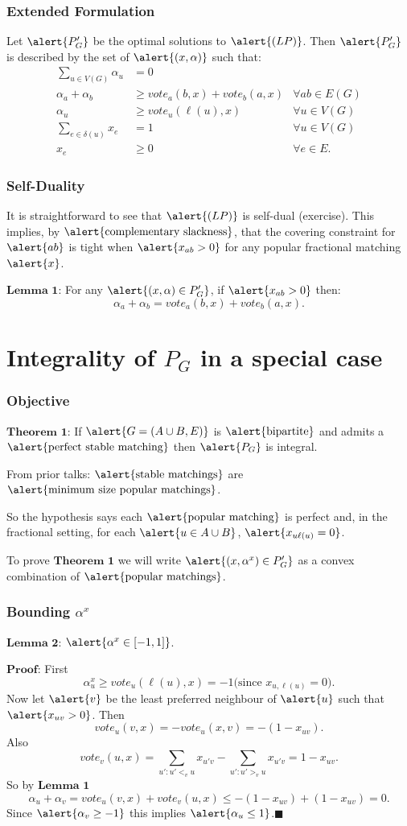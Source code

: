 \documentclass[10pt]{beamer}
\begin{document}
\begin{frame}
\frametitle{Extended Formulation}
Let $\alert{P'_G}$ be the optimal solutions to $\alert{(LP)}$. Then $\alert{P'_G}$ is described by the set of $\alert{(x,\alpha)}$ such that:
\begin{align*}
\sum_{u \in V(G)} \alpha_u &= 0 \\
 \alpha_a + \alpha_b &\geq vote_a(b,x) + vote_b(a,x) &\forall ab \in E(G) \\
\alpha_u &\geq vote_u(\ell(u),x) &\forall u \in V(G) \\
\sum_{e \in \delta(u)} x_e &=1 &\forall u \in V(G) \\
x_e &\geq 0 &\forall e \in E.
\end{align*}
\end{frame}

\begin{frame}
\frametitle{Self-Duality}
It is straightforward to see that $\alert{(LP)}$ is self-dual (exercise). This implies, by $\text{\alert{complementary slackness}}$, that the covering constraint for $\alert{ab}$ is tight when $\alert{x_{ab} > 0}$ for any popular fractional matching $\alert{x}$.

$\textbf{Lemma 1}$: For any $\alert{(x,\alpha) \in P'_G}$, if $\alert{x_{ab} > 0}$ then:
$$\alpha_a + \alpha_b = vote_a(b,x) + vote_b(a,x).$$ 
\end{frame}
\section{Integrality of $P_G$ in a special case}
\begin{frame}
\frametitle{Objective}
$\textbf{Theorem 1:}$ If $\alert{G =(A\cup B, E)}$ is $\text{\alert{bipartite}}$ and admits a $\text{\alert{perfect stable matching}}$ then $\alert{P_G}$ is integral.

From prior talks: $\text{\alert{stable matchings}}$ are $\text{\alert{minimum size popular matchings}}$.

So the hypothesis says each $\text{\alert{popular matching}}$ is perfect and, in the fractional setting, for each $\alert{u\in A \cup B}$, $\alert{x_{u\ell(u)} = 0}$.

To prove $\textbf{Theorem 1}$ we will write $\alert{(x,\alpha^x) \in P_G'}$ as a convex combination of $\text{\alert{popular matchings}}$.
\end{frame}

\begin{frame}
\frametitle{Bounding $\alpha^x$}
$\textbf{Lemma 2:}$ $\alert{\alpha^x \in [-1,1]}$.

$\textbf{Proof:}$ First
$$\alpha^x_u \geq vote_u(\ell(u), x) = -1 \text{(since }x_{u,\ell(u)} = 0\text{).}$$
Now let $\alert{v}$ be the least preferred neighbour of $\alert{u}$ such that $\alert{x_{uv} >0}$. Then
$$vote_u(v,x) = -vote_u(x,v) = -(1-x_{uv}).$$
Also
$$vote_v(u,x) = \sum_{u':u' <_v u} x_{u'v} - \sum_{u':u' >_v u} x_{u'v} = 1-x_{uv}.$$
So by $\textbf{Lemma 1}$
$$\alpha_u + \alpha_v = vote_u(v,x) + vote_v(u,x) \leq -(1-x_{uv}) + (1-x_{uv}) = 0.$$
Since $\alert{\alpha_v \geq -1}$ this implies $\alert{\alpha_u \leq 1}$.$\blacksquare$
\end{frame}
\end{document}
